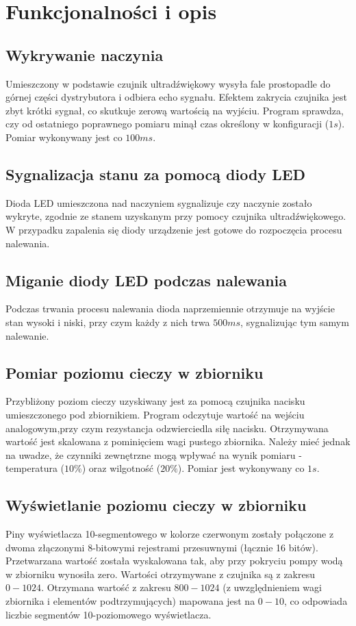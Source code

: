 \documentclass[11pt]{article}
\begin{document}
\section{Funkcjonalności i opis}

\subsection{Wykrywanie naczynia}
Umieszczony w podstawie czujnik ultradźwiękowy wysyła fale prostopadle do górnej części dystrybutora i odbiera echo sygnału. Efektem zakrycia czujnika jest zbyt krótki sygnał, co skutkuje zerową wartością na wyjściu. Program sprawdza, czy od ostatniego poprawnego pomiaru minął czas określony w konfiguracji ($1s$). Pomiar wykonywany jest co $100ms$.

\subsection{Sygnalizacja stanu za pomocą diody LED}
Dioda LED umieszczona nad naczyniem sygnalizuje czy naczynie zostało wykryte, zgodnie ze stanem uzyskanym przy pomocy czujnika ultradźwiękowego. W przypadku zapalenia się diody urządzenie jest gotowe do rozpoczęcia procesu nalewania.

\subsection{Miganie diody LED podczas nalewania}
Podczas trwania procesu nalewania dioda naprzemiennie otrzymuje na wyjście stan wysoki i niski, przy czym każdy z nich trwa $500ms$, sygnalizując tym samym nalewanie. 

\subsection{Pomiar poziomu cieczy w zbiorniku}
Przybliżony poziom cieczy uzyskiwany jest za pomocą czujnika nacisku umieszczonego pod zbiornikiem. Program odczytuje wartość na wejściu analogowym,przy czym rezystancja odzwierciedla siłę nacisku. Otrzymywana wartość jest skalowana z pominięciem wagi pustego zbiornika. Należy mieć jednak na uwadze,
że czynniki zewnętrzne mogą wpływać na wynik pomiaru - temperatura ($10\%$) oraz wilgotność ($20\%$). Pomiar jest wykonywany co $1s$.

\subsection{Wyświetlanie poziomu cieczy w zbiorniku}
Piny wyświetlacza 10-segmentowego w kolorze czerwonym zostały połączone z dwoma złączonymi 8-bitowymi rejestrami przesuwnymi (łącznie 16 bitów). Przetwarzana wartość została wyskalowana tak, 
aby przy pokryciu pompy wodą w zbiorniku wynosiła zero. Wartości otrzymywane z czujnika są z zakresu $0-1024$. Otrzymana wartość z zakresu $800-1024$ (z uwzględnieniem wagi zbiornika i elementów podtrzymujących) mapowana jest na $0-10$, co odpowiada liczbie segmentów 10-poziomowego wyświetlacza.
\end{document}
